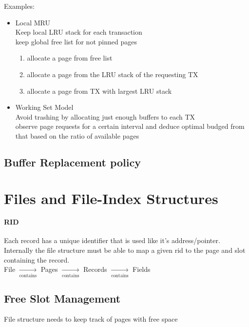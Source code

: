     Examples:
    \begin{itemize}
        \item Local MRU \\
        Keep local LRU stack for each transaction \\
        keep global free list for not pinned pages\\
        \begin{enumerate}
            \item allocate a page from free list
            \item allocate a page from the LRU stack of the requesting TX
            \item allocate a page from TX with largest LRU stack
        \end{enumerate}
        
        \item Working Set Model \\
        Avoid trashing by allocating just enough buffers to each TX \\
        observe page requests for a certain interval and deduce optimal budged from that based on the ratio of available pages 
    \end{itemize}

    \subsection{Buffer Replacement policy}

\section{Files and File-Index Structures}
\paragraph{RID} Each record has a unique identifier that is used like it's address/pointer. Internally the file structure must be able to map a given rid to the page and slot containing the record. \\
File $\xrightarrow[\text{contains}]{}$ Pages $\xrightarrow[\text{contains}]{}$ Records $\xrightarrow[\text{contains}]{}$ Fields \\

\subsection{Free Slot Management}
File structure needs to keep track of pages with free space

